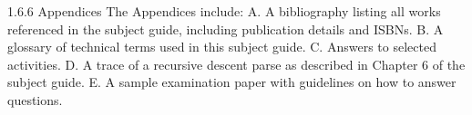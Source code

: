 1.6.6 Appendices
The Appendices include:
A. A bibliography listing all works referenced in the subject guide, including
publication details and ISBNs.
B. A glossary of technical terms used in this subject guide.
C. Answers to selected activities.
D. A trace of a recursive descent parse as described in Chapter 6 of the subject guide.
E. A sample examination paper with guidelines on how to answer questions.

